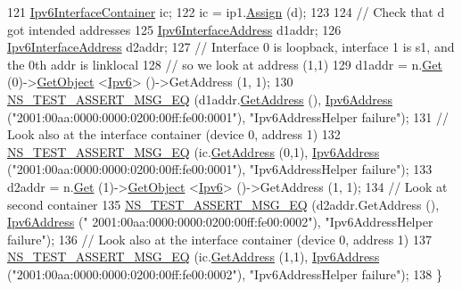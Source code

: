 \begin{DoxyCode}
121   \hyperlink{classns3_1_1Ipv6InterfaceContainer}{Ipv6InterfaceContainer} ic;
122   ic = ip1.\hyperlink{classns3_1_1Ipv6AddressHelper_aad4685588aea1757beaf881bc4157912}{Assign} (d);
123 
124   \textcolor{comment}{// Check that d got intended addresses}
125   \hyperlink{classns3_1_1Ipv6InterfaceAddress}{Ipv6InterfaceAddress} d1addr;
126   \hyperlink{classns3_1_1Ipv6InterfaceAddress}{Ipv6InterfaceAddress} d2addr;
127   \textcolor{comment}{// Interface 0 is loopback, interface 1 is s1, and the 0th addr is linklocal }
128   \textcolor{comment}{// so we look at address (1,1)}
129   d1addr = n.\hyperlink{classns3_1_1NodeContainer_a9ed96e2ecc22e0f5a3d4842eb9bf90bf}{Get} (0)->\hyperlink{classns3_1_1Object_a13e18c00017096c8381eb651d5bd0783}{GetObject} <\hyperlink{classns3_1_1Ipv6}{Ipv6}> ()->GetAddress (1, 1); 
130   \hyperlink{group__testing_ga2a9d78cffb3db8e867c35fff0b698cf5}{NS\_TEST\_ASSERT\_MSG\_EQ} (d1addr.\hyperlink{classns3_1_1Ipv6InterfaceAddress_a80d4caacff72bddc3045a5929519e107}{GetAddress} (), 
      \hyperlink{classns3_1_1Ipv6Address}{Ipv6Address} (\textcolor{stringliteral}{"2001:00aa:0000:0000:0200:00ff:fe00:0001"}), \textcolor{stringliteral}{"Ipv6AddressHelper failure"});
131   \textcolor{comment}{// Look also at the interface container (device 0, address 1)}
132   \hyperlink{group__testing_ga2a9d78cffb3db8e867c35fff0b698cf5}{NS\_TEST\_ASSERT\_MSG\_EQ} (ic.\hyperlink{classns3_1_1Ipv6InterfaceContainer_ac888a9b8e70b501e44fdb12e4adc7d79}{GetAddress} (0,1), 
      \hyperlink{classns3_1_1Ipv6Address}{Ipv6Address} (\textcolor{stringliteral}{"2001:00aa:0000:0000:0200:00ff:fe00:0001"}), \textcolor{stringliteral}{"Ipv6AddressHelper failure"});
133   d2addr = n.\hyperlink{classns3_1_1NodeContainer_a9ed96e2ecc22e0f5a3d4842eb9bf90bf}{Get} (1)->\hyperlink{classns3_1_1Object_a13e18c00017096c8381eb651d5bd0783}{GetObject} <\hyperlink{classns3_1_1Ipv6}{Ipv6}> ()->GetAddress (1, 1); 
134   \textcolor{comment}{// Look at second container}
135   \hyperlink{group__testing_ga2a9d78cffb3db8e867c35fff0b698cf5}{NS\_TEST\_ASSERT\_MSG\_EQ} (d2addr.GetAddress (), \hyperlink{classns3_1_1Ipv6Address}{Ipv6Address} (\textcolor{stringliteral}{"
      2001:00aa:0000:0000:0200:00ff:fe00:0002"}), \textcolor{stringliteral}{"Ipv6AddressHelper failure"});
136   \textcolor{comment}{// Look also at the interface container (device 0, address 1)}
137   \hyperlink{group__testing_ga2a9d78cffb3db8e867c35fff0b698cf5}{NS\_TEST\_ASSERT\_MSG\_EQ} (ic.\hyperlink{classns3_1_1Ipv6InterfaceContainer_ac888a9b8e70b501e44fdb12e4adc7d79}{GetAddress} (1,1), 
      \hyperlink{classns3_1_1Ipv6Address}{Ipv6Address} (\textcolor{stringliteral}{"2001:00aa:0000:0000:0200:00ff:fe00:0002"}), \textcolor{stringliteral}{"Ipv6AddressHelper failure"});
138 \}
\end{DoxyCode}


